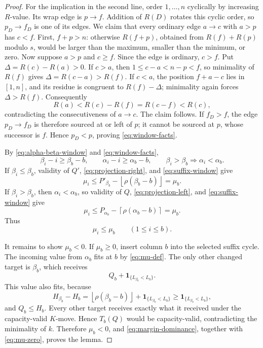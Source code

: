 \documentclass[10pt]{article}
\newcommand{\ind}{\mathbf 1}
\begin{document}
\begin{proof}
For the implication in the second line, order \(1,\ldots,n\) cyclically by
increasing \(R\)-value.  Its wrap edge is \(p\to f\).  Addition of \(R(D)\)
rotates this cyclic order, so \(p_D\to f_D\) is one of its edges.  We claim
that every ordinary edge \(a\to c\) with \(a>p\) has \(c<f\).  First,
\(f+p>n\): otherwise \(R(f+p)\), obtained from \(R(f)+R(p)\) modulo \(s\),
would be larger than the maximum, smaller than the minimum, or zero.  Now
suppose \(a>p\) and \(c\ge f\).  Since the edge is ordinary, \(c>f\).  Put
\(\Delta=R(c)-R(a)>0\).  If \(c>a\), then
\(1\le c-a<n-p<f\), so minimality of \(R(f)\) gives
\(\Delta=R(c-a)>R(f)\).  If \(c<a\), the position \(f+a-c\) lies in
\([1,n]\), and its residue is congruent to \(R(f)-\Delta\); minimality again
forces \(\Delta>R(f)\).  Consequently
\[
  R(a)<R(c)-R(f)=R(c-f)<R(c),
\]
contradicting the consecutiveness of \(a\to c\).  The claim follows.  If
\(f_D>f\), the edge \(p_D\to f_D\) is therefore sourced at or left of \(p\);
it cannot be sourced at \(p\), whose successor is \(f\).  Hence \(p_D<p\),
proving \eqref{eq:window-facts}.

By \eqref{eq:alpha-beta-window} and \eqref{eq:window-facts},
\begin{equation}
  \beta_i-i\ge\beta_b-b,
  \qquad
  \alpha_i-i\ge\alpha_b-b,
  \qquad
  \beta_i>\beta_b\Longrightarrow\alpha_i<\alpha_b.
  \label{eq:suffix-window}
\end{equation}
If \(\beta_i\le\beta_b\), validity of \(Q'\),
\eqref{eq:projection-right}, and \eqref{eq:suffix-window} give
\[
  \mu_i
  \le P'_{\beta_b}-\left\lfloor\rho(\beta_b-b)\right\rfloor
  =\mu_b.
\]
If \(\beta_i>\beta_b\), then \(\alpha_i<\alpha_b\), so validity of \(Q\),
\eqref{eq:projection-left}, and \eqref{eq:suffix-window} give
\[
  \mu_i
  \le P_{\alpha_b}-\left\lceil\rho(\alpha_b-b)\right\rceil
  =\mu_b.
\]
Thus
\begin{equation}
  \mu_i\le\mu_b\qquad(1\le i\le b).
  \label{eq:margin-dominance}
\end{equation}

It remains to show \(\mu_b<0\).  If \(\mu_b\ge0\), insert column \(b\) into
the selected suffix cycle.  The incoming value from \(\alpha_b\) fits at
\(b\) by \eqref{eq:mu-def}.  The only other changed target is \(\beta_b\),
which receives
\[
  Q_b+\ind_{\{L_{\beta_b}<L_b\}}.
\]
This value also fits, because
\[
  H_{\beta_b}-H_b
  =\left\lfloor\rho(\beta_b-b)\right\rfloor
   +\ind_{\{L_{\beta_b}<L_b\}}
  \ge \ind_{\{L_{\beta_b}<L_b\}},
\]
and \(Q_b\le H_b\).  Every other target receives exactly what it received
under the capacity-valid \(K\)-move.  Hence \(T_b(Q)\) would be
capacity-valid, contradicting the minimality of \(k\).  Therefore
\(\mu_b<0\), and \eqref{eq:margin-dominance}, together with
\eqref{eq:mu-zero}, proves the lemma.
\end{proof}
\end{document}
